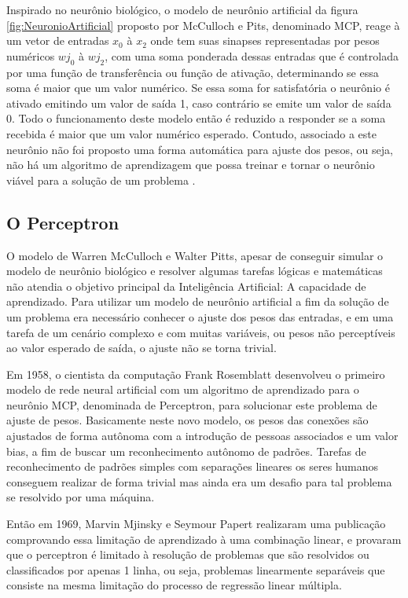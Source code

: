     Inspirado no neurônio biológico, o modelo de neurônio artificial da figura \ref{fig:NeuronioArtificial} proposto por McCulloch e Pits, denominado MCP, reage à um vetor de entradas $x_0$ à $x_2$ onde tem suas sinapses representadas por pesos numéricos $wj_0$ à $wj_2$, com uma soma ponderada dessas entradas que é controlada por uma função de transferência ou função de ativação, determinando se essa soma é maior que um valor numérico. Se essa soma for satisfatória o neurônio é ativado emitindo um valor de saída 1, caso contrário se emite um valor de saída 0.
    Todo o funcionamento deste modelo então é reduzido a responder se a soma recebida é maior que um valor numérico esperado. Contudo, associado a este neurônio não foi proposto uma forma automática para ajuste dos pesos, ou seja, não há um algoritmo de aprendizagem que possa treinar e tornar o neurônio viável para a solução de um problema \cite{Haykin1994}.
        
    \subsection{O Perceptron}

    O modelo de Warren McCulloch e Walter Pitts, apesar de conseguir simular o modelo de neurônio biológico e resolver algumas tarefas lógicas e matemáticas não atendia o objetivo principal da Inteligência Artificial: A capacidade de aprendizado.
    Para utilizar um modelo de neurônio artificial a fim da solução de um problema era necessário conhecer o ajuste dos pesos das entradas, e em uma tarefa de um cenário complexo e com muitas variáveis, ou pesos não perceptíveis ao valor esperado de saída, o ajuste não se torna trivial.
                
    Em 1958, o cientista da computação Frank Rosemblatt desenvolveu o primeiro modelo de rede neural artificial com um algoritmo de aprendizado para o neurônio MCP, denominada de Perceptron, para solucionar este problema de ajuste de pesos.
    Basicamente neste novo modelo, os pesos das conexões são ajustados de forma autônoma com a introdução de pessoas associados e um valor bias, a fim de buscar um reconhecimento autônomo de padrões. Tarefas de reconhecimento de padrões simples com separações lineares os seres humanos conseguem realizar de forma trivial mas ainda era um desafio para tal problema se resolvido por uma máquina.
                
    Então em 1969, Marvin Mjinsky e Seymour Papert realizaram uma publicação comprovando essa limitação de aprendizado à uma combinação linear, e provaram que o perceptron é limitado à resolução de problemas que são resolvidos ou classificados por apenas 1 linha, ou seja, problemas linearmente separáveis que consiste na mesma limitação do processo de regressão linear múltipla.
                
